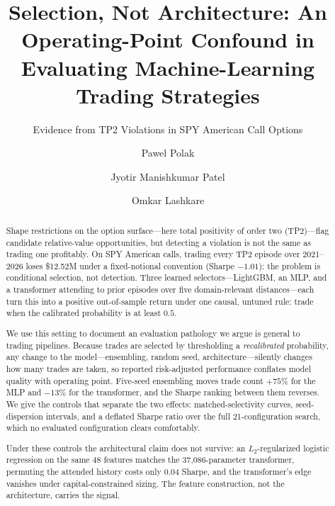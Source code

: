 \documentclass[sigconf,review]{acmart}
\begin{document}
\title{Selection, Not Architecture: An Operating-Point Confound in Evaluating Machine-Learning Trading Strategies}
\subtitle{Evidence from TP2 Violations in SPY American Call Options}

\author{Pawel Polak}

\author{Jyotir Manishkumar Patel}

\author{Omkar Lashkare}

\renewcommand{\shortauthors}{Polak, Patel, Lashkare}

\begin{abstract}
Shape restrictions on the option surface---here total positivity of order two (TP2)---flag candidate relative-value opportunities, but detecting a violation is not the same as trading one profitably. On SPY American calls, trading every TP2 episode over 2021--2026 loses \$12.52M under a fixed-notional convention (Sharpe $-1.01$): the problem is conditional selection, not detection. Three learned selectors---LightGBM, an MLP, and a transformer attending to prior episodes over five domain-relevant distances---each turn this into a positive out-of-sample return under one causal, untuned rule: trade when the calibrated probability is at least $0.5$.

We use this setting to document an evaluation pathology we argue is general to trading pipelines. Because trades are selected by thresholding a \emph{recalibrated} probability, any change to the model---ensembling, random seed, architecture---silently changes how many trades are taken, so reported risk-adjusted performance conflates model quality with operating point. Five-seed ensembling moves trade count $+75\%$ for the MLP and $-13\%$ for the transformer, and the Sharpe ranking between them reverses. We give the controls that separate the two effects: matched-selectivity curves, seed-dispersion intervals, and a deflated Sharpe ratio over the full 21-configuration search, which no evaluated configuration clears comfortably.

Under these controls the architectural claim does not survive: an $L_2$-regularized logistic regression on the same 48 features matches the 37{,}086-parameter transformer, permuting the attended history costs only 0.04 Sharpe, and the transformer's edge vanishes under capital-constrained sizing. The feature construction, not the architecture, carries the signal.
\end{abstract}
\end{document}
